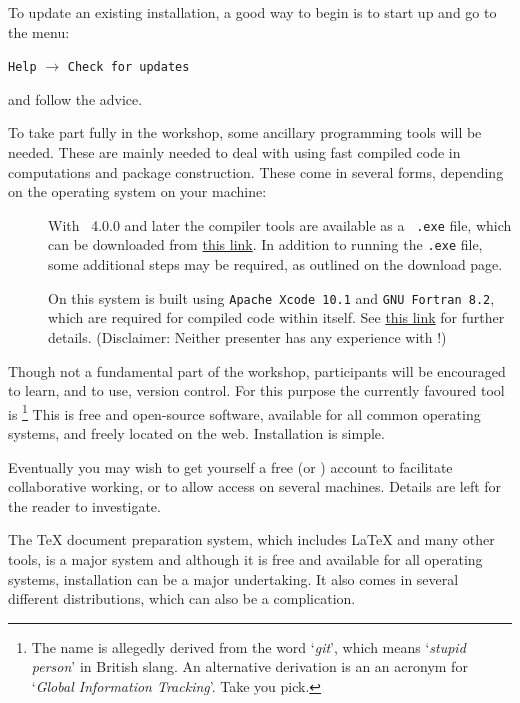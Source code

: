 \documentclass[12pt]{article}
\begin{document}
\begin{description}
  To update an existing installation, a good way to begin is to start
  up \RStudio and go to the menu:
  \begin{center}
    \texttt{Help} $\longrightarrow$ \texttt{Check for updates}
  \end{center}
  and follow the advice.
  
\item[Other tools used with \R] To take part fully in the workshop,
  some ancillary programming tools will be needed.  These are mainly
  needed to deal with using fast compiled code in computations and
  package construction. These come in several forms, depending on the
  operating system on your machine:
  \begin{description}
  \item[\Windows] With \R~4.0.0 and later the compiler tools are
    available as a \Windows~\verb|.exe| file, which can be downloaded
    from \href{https://cloud.r-project.org/bin/windows/Rtools/}{this
      link}.  In addition to running the \verb|.exe| file, some
    additional steps may be required, as outlined on the download
    page.
  \item[\MacOS] On this system \R is built using
    \verb|Apache Xcode 10.1| and \verb|GNU Fortran 8.2|, which are
    required for compiled code within \R itself.  See
    \href{https://cloud.r-project.org/bin/macosx/tools/}{this link}
    for further details. (Disclaimer: Neither presenter has any
    experience with \MacOS!)
  \end{description}
\item[Version control] Though not a fundamental part of the workshop,
  participants will be encouraged to learn, and to use, version
  control.  For this purpose the currently favoured tool is
  \git\footnote{The name is allegedly derived from the word
    `\emph{git}', which means `\emph{stupid person}' in British slang.
    An alternative derivation is an an acronym for `\emph{Global
      Information Tracking}'.  Take you pick.}  This is free and
  open-source software, available for all common operating systems,
  and freely located on the web.  Installation is simple.

  Eventually you may wish to get yourself a free \github (or \gitlab)
  account to facilitate collaborative working, or to allow access on
  several machines.  Details are left for the reader to investigate.
  
\item[\TeX{} and \LaTeX] The \TeX{} document preparation system, which
  includes \LaTeX{} and many other tools, is a major system and
  although it is free and available for all operating systems,
  installation can be a major undertaking.  It also comes in several
  different distributions, which can also be a complication.


\end{description}
\end{document}
